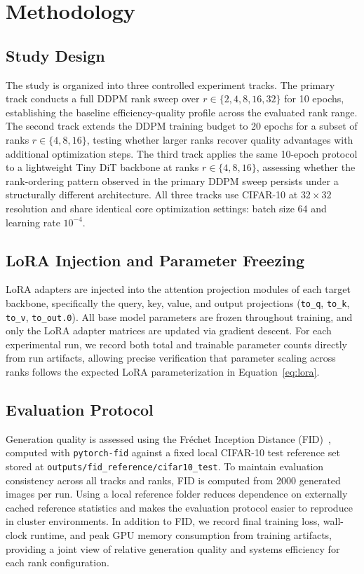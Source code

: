 \section{Methodology}

\subsection{Study Design}

The study is organized into three controlled experiment tracks. The primary track conducts a full DDPM rank sweep over $r \in \{2, 4, 8, 16, 32\}$ for 10 epochs, establishing the baseline efficiency-quality profile across the evaluated rank range. The second track extends the DDPM training budget to 20 epochs for a subset of ranks $r \in \{4, 8, 16\}$, testing whether larger ranks recover quality advantages with additional optimization steps. The third track applies the same 10-epoch protocol to a lightweight Tiny DiT backbone at ranks $r \in \{4, 8, 16\}$, assessing whether the rank-ordering pattern observed in the primary DDPM sweep persists under a structurally different architecture. All three tracks use CIFAR-10 at $32 \times 32$ resolution and share identical core optimization settings: batch size 64 and learning rate $10^{-4}$.

\subsection{LoRA Injection and Parameter Freezing}

LoRA adapters are injected into the attention projection modules of each target backbone, specifically the query, key, value, and output projections (\texttt{to\_q}, \texttt{to\_k}, \texttt{to\_v}, \texttt{to\_out.0}). All base model parameters are frozen throughout training, and only the LoRA adapter matrices are updated via gradient descent. For each experimental run, we record both total and trainable parameter counts directly from run artifacts, allowing precise verification that parameter scaling across ranks follows the expected LoRA parameterization in Equation~\ref{eq:lora}.

\subsection{Evaluation Protocol}

Generation quality is assessed using the Fr\'{e}chet Inception Distance (FID)~\cite{heusel2017fid}, computed with \texttt{pytorch-fid} against a fixed local CIFAR-10 test reference set stored at \texttt{outputs/fid\_reference/cifar10\_test}. To maintain evaluation consistency across all tracks and ranks, FID is computed from 2000 generated images per run. Using a local reference folder reduces dependence on externally cached reference statistics and makes the evaluation protocol easier to reproduce in cluster environments. In addition to FID, we record final training loss, wall-clock runtime, and peak GPU memory consumption from training artifacts, providing a joint view of relative generation quality and systems efficiency for each rank configuration.

